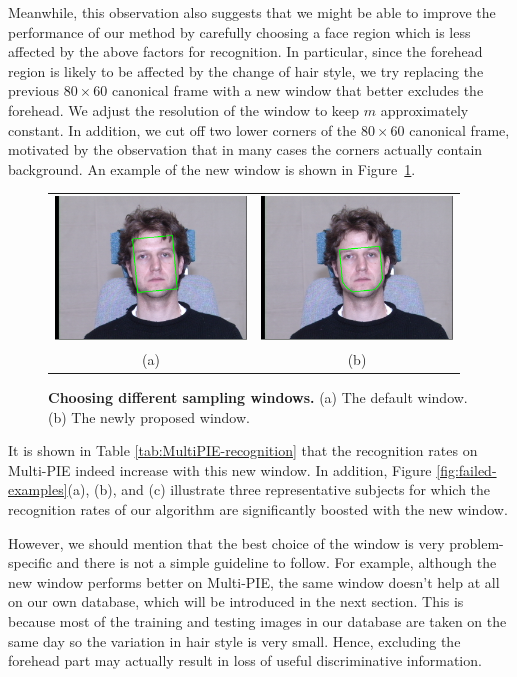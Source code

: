 \documentclass[12pt,journal,draftcls,letterpaper,onecolumn]{IEEEtran}
\begin{document}
Meanwhile, this observation also suggests that we might be able
to improve the performance of our method by carefully choosing
a face region which is less affected by the above factors for
recognition. In particular, since the forehead region is likely
to be affected by the change of hair style, we try replacing
the previous $80 \times 60$ canonical frame with a new
window that better excludes the forehead. We adjust the
resolution of the window to keep $m$ approximately constant. In addition,
we cut off two lower corners of the $80 \times 60$ canonical frame, motivated by
the observation that in many cases the corners
actually contain background. An example of the new window
is shown in Figure~\ref{fig:new-mask}.

\begin{figure}
\centering
\begin{tabular}{cc}
\includegraphics[height=1.5in]{figures_pami/example.png} &
\includegraphics[height=1.5in]{figures_pami/example_new.png}\\
(a) & (b)
\end{tabular}
\caption{{\bf Choosing different sampling windows.} (a) The default window. (b) The newly proposed window.}
\label{fig:new-mask}
\end{figure}

It is shown in Table \ref{tab:MultiPIE-recognition} that the
recognition rates on Multi-PIE indeed increase with this new
window. In addition, Figure \ref{fig:failed-examples}(a), (b),
and (c) illustrate three representative subjects for which the
recognition rates of our algorithm are significantly boosted
with the new window.

However, we should mention that the best choice of the window
is very problem-specific and there is
not a simple guideline to follow. For example, although the new
window performs better on Multi-PIE, the same window doesn't
help at all on our own database, which will be introduced in
the next section. This is because most of the training and
testing images in our database are taken on the same day so the
variation in hair style is very small. Hence, excluding the
forehead part may actually result in loss of useful
discriminative information.
\end{document}
